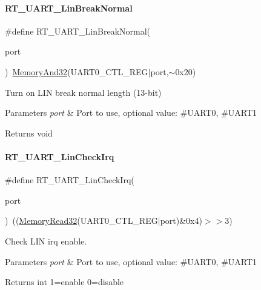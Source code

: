 \paragraph{\texorpdfstring{R\+T\+\_\+\+U\+A\+R\+T\+\_\+\+Lin\+Break\+Normal}{RT\_UART\_LinBreakNormal}}
{\footnotesize\ttfamily \#define R\+T\+\_\+\+U\+A\+R\+T\+\_\+\+Lin\+Break\+Normal(\begin{DoxyParamCaption}\item[{}]{port }\end{DoxyParamCaption})~\mbox{\hyperlink{a00020_a5c1a2bd4c1bd4c2f429d8042a45327ff}{Memory\+And32}}(U\+A\+R\+T0\+\_\+\+C\+T\+L\+\_\+\+R\+EG$\vert$port,$\sim$0x20)}



Turn on L\+IN break normal length (13-\/bit) 


\begin{DoxyParams}{Parameters}
{\em port} & Port to use, optional value\+: \#\+U\+A\+R\+T0, \#\+U\+A\+R\+T1 \\
\hline
\end{DoxyParams}
\begin{DoxyReturn}{Returns}
void 
\end{DoxyReturn}
\mbox{\label{a00056_a2e2715198f9716282584f34a7f472649}} 
\paragraph{\texorpdfstring{R\+T\+\_\+\+U\+A\+R\+T\+\_\+\+Lin\+Check\+Irq}{RT\_UART\_LinCheckIrq}}
{\footnotesize\ttfamily \#define R\+T\+\_\+\+U\+A\+R\+T\+\_\+\+Lin\+Check\+Irq(\begin{DoxyParamCaption}\item[{}]{port }\end{DoxyParamCaption})~((\mbox{\hyperlink{a00020_a706b02571285f92589fbb0b964d7d0bb}{Memory\+Read32}}(U\+A\+R\+T0\+\_\+\+C\+T\+L\+\_\+\+R\+EG$\vert$port)\&0x4)$>$$>$3)}



Check L\+IN irq enable. 


\begin{DoxyParams}{Parameters}
{\em port} & Port to use, optional value\+: \#\+U\+A\+R\+T0, \#\+U\+A\+R\+T1 \\
\hline
\end{DoxyParams}
\begin{DoxyReturn}{Returns}
int 1=enable 0=disable 
\end{DoxyReturn}
\mbox{\label{a00056_ad1e6c13693e5ea54a55ce78635617178}} 
